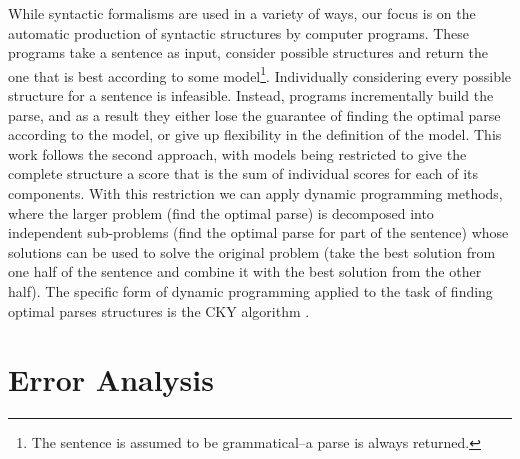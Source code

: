
While syntactic formalisms are used in a variety of ways, our focus is on the automatic production of syntactic structures by computer programs.
These programs take a sentence as input, consider possible structures and return the one that is best according to some model\footnote{The sentence is assumed to be grammatical--a parse is always returned.}.
Individually considering every possible structure for a sentence is infeasible.
Instead, programs incrementally build the parse, and as a result they either lose the guarantee of finding the optimal parse according to the model, or give up flexibility in the definition of the model.
This work follows the second approach, with models being restricted to give the complete structure a score that is the sum of individual scores for each of its components.
With this restriction we can apply dynamic programming methods, where the larger problem (find the optimal parse) is decomposed into independent sub-problems (find the optimal parse for part of the sentence) whose solutions can be used to solve the original problem (take the best solution from one half of the sentence and combine it with the best solution from the other half).
The specific form of dynamic programming applied to the task of finding optimal parses structures is the CKY algorithm \parencite{Cocke:1969,Kasami:1966,Younger:1967}.

\section{Error Analysis}

